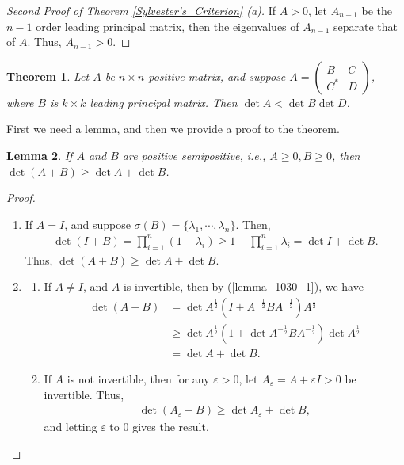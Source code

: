 \documentclass[10pt]{book}
\newtheorem{theorem}{Theorem}[chapter]
\newtheorem{lemma}[theorem]{Lemma}
\theoremstyle{definition}
\numberwithin{equation}{chapter}
\begin{document}
\begin{proof}[Second Proof of Theorem \ref{Sylvester's_Criterion} (a)]
If $A > 0$, let $A_{n-1}$ be the $n-1$ order leading principal matrix, then the eigenvalues of $A_{n-1}$ separate that of $A$. Thus, $A_{n-1} > 0$.
\end{proof}

\medskip

\begin{theorem}\label{block_matrix_inequality}
Let $A$ be $n \times n$ positive matrix, and suppose $A = \begin{pmatrix} B & C \\ C^* & D \end{pmatrix}$, where $B$ is $k \times k$ leading principal matrix. Then $\det A < \det B \det D$.
\end{theorem}

First we need a lemma, and then we provide a proof to the theorem.

\begin{lemma}
If $A$ and $B$ are positive semipositive, i.e., $A \geq 0, B \geq 0$, then $\det(A + B) \geq \det A + \det B$.
\end{lemma}
\begin{proof}
~\begin{enumerate}[label=(\alph*)]
    \item If $A = I$, and suppose $\sigma(B) = \{\lambda_1, \cdots, \lambda_n\}$. Then,
    \begin{align}\label{lemma_1030_1}
        \det(I + B) = \prod^n_{i=1} (1 + \lambda_i) \geq 1 + \prod^n_{i=1} \lambda_i = \det I + \det B.
    \end{align}
    Thus, $\det(A + B) \geq \det A + \det B$.
    
    \item 
    \begin{enumerate}[label=\arabic*)]
        \item If $A \neq I$, and $A$ is invertible, then by (\ref{lemma_1030_1}), we have
        \begin{align*}
            \det (A + B) & = \det A^{\frac{1}{2}}\left(I + A^{-\frac{1}{2}}BA^{-\frac{1}{2}}\right) A^{\frac{1}{2}} \\
            & \geq \det A^{\frac{1}{2}} \left(1 + \det A^{-\frac{1}{2}} B A^{-\frac{1}{2}} \right) \det A^{\frac{1}{2}} \\
            & = \det A + \det B.
        \end{align*}
        
        \item If $A$ is not invertible, then for any $\varepsilon > 0$, let $A_\varepsilon = A + \varepsilon I > 0$ be invertible. Thus, 
        \begin{align*}
            \det (A_\varepsilon + B) \geq \det A_\varepsilon + \det B,
        \end{align*}
        and letting $\varepsilon$ to $0$ gives the result.
    \end{enumerate}
\end{enumerate}
\end{proof}
\end{document}
